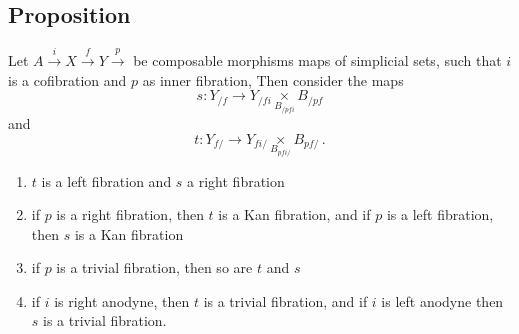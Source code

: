     \subsection{Proposition}\label{chVI-3-43}
        Let $A \xrightarrow{i} X \xrightarrow{f} Y \xrightarrow{p}$ be composable morphisms maps of simplicial sets, such that $i$ is a cofibration and $p$ as inner fibration, Then consider the maps
        \begin{equation*}
            s \colon Y_{/ f} \to Y_{/ f i} \underset{B_{/ p f i}}{\times} B_{/ p f}
        \end{equation*}
        and
        \begin{equation*}
            t \colon Y_{f /} \to Y_{f i /} \underset{B_{p f i /}}{\times} B_{p f /} \,. 
        \end{equation*}
        \begin{enumerate}[label=\roman*)]
            \item 
                $t$ is a left fibration and $s$ a right fibration
            \item 
                if $p$ is a right fibration, then $t$ is a Kan fibration, and if $p$ is a left fibration, then $s$ is a Kan fibration
            \item 
                if $p$ is a trivial fibration, then so are $t$ and $s$
            \item 
                if $i$ is right anodyne, then $t$ is a trivial fibration, and if $i$ is left anodyne then $s$ is a trivial fibration.
        \end{enumerate}

